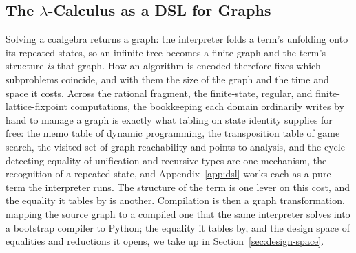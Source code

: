 \subsection{The \texorpdfstring{$\lambda$}{lambda}-Calculus as a DSL for Graphs}\label{sec:graphs}
Solving a coalgebra returns a graph: the interpreter folds a term's unfolding onto its repeated states, so an infinite tree becomes a finite graph and the term's structure \emph{is} that graph. How an algorithm is encoded therefore fixes which subproblems coincide, and with them the size of the graph and the time and space it costs. Across the rational fragment, the finite-state, regular, and finite-lattice-fixpoint computations, the bookkeeping each domain ordinarily writes by hand to manage a graph is exactly what tabling on state identity supplies for free: the memo table of dynamic programming, the transposition table of game search, the visited set of graph reachability and points-to analysis, and the cycle-detecting equality of unification and recursive types are one mechanism, the recognition of a repeated state, and Appendix~\ref{app:dsl} works each as a pure term the interpreter runs. The structure of the term is one lever on this cost, and the equality it tables by is another. Compilation is then a graph transformation, mapping the source graph to a compiled one that the same interpreter solves into a bootstrap compiler to Python; the equality it tables by, and the design space of equalities and reductions it opens, we take up in Section~\ref{sec:design-space}.

